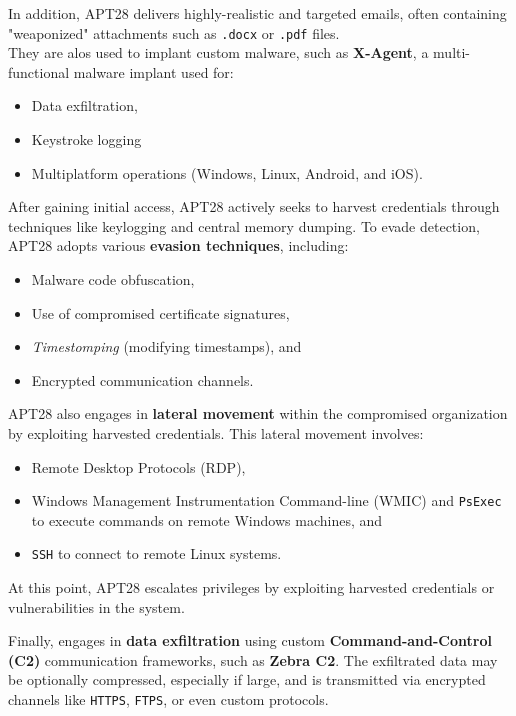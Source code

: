 In addition, APT28 delivers highly-realistic and targeted emails, often containing "weaponized" attachments such as \texttt{.docx} or \texttt{.pdf} files. \\They are alos used to implant custom malware, such as \textbf{X-Agent}, a multi-functional malware implant used for:
\begin{itemize}[itemsep=0pt]
    \item Data exfiltration,
    \item Keystroke logging
    \item Multiplatform operations (Windows, Linux, Android, and iOS).
\end{itemize}

After gaining initial access, APT28 actively seeks to harvest credentials through techniques like keylogging and central memory dumping. To evade detection, APT28 adopts various \textbf{evasion techniques}, including:
\begin{itemize}[itemsep=0pt]
    \item Malware code obfuscation,
    \item Use of compromised certificate signatures,
    \item \textit{Timestomping} (modifying timestamps), and
    \item Encrypted communication channels.
\end{itemize}

APT28 also engages in \textbf{lateral movement} within the compromised organization by exploiting harvested credentials. This lateral movement involves:
\begin{itemize}[itemsep=0pt]
    \item Remote Desktop Protocols (RDP),
    \item Windows Management Instrumentation Command-line (WMIC) and \texttt{PsExec} to execute commands on remote Windows machines, and
    \item \texttt{SSH} to connect to remote Linux systems.
\end{itemize}

At this point, APT28 escalates privileges by exploiting harvested credentials or vulnerabilities in the system. \bigskip

Finally, engages in \textbf{data exfiltration} using custom \textbf{Command-and-Control (C2)} communication frameworks, such as \textbf{Zebra C2}. The exfiltrated data may be optionally compressed, especially if large, and is transmitted via encrypted channels like \texttt{HTTPS}, \texttt{FTPS}, or even custom protocols.

